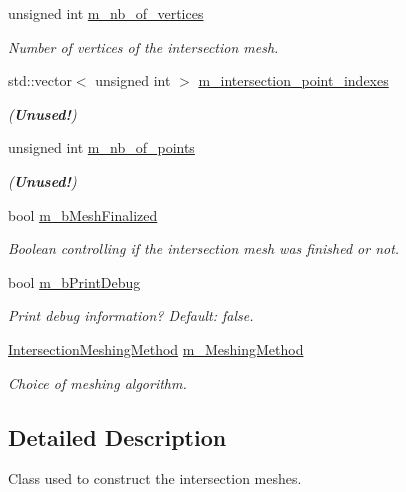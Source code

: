 \begin{DoxyCompactItemize}
unsigned int \hyperlink{classcarl_1_1_mesh___intersection_ac2765c9bdf5f15878a1cff52db5551aa}{m\+\_\+nb\+\_\+of\+\_\+vertices}
\begin{DoxyCompactList}\small\item\em Number of vertices of the intersection mesh. \end{DoxyCompactList}\item 
std\+::vector$<$ unsigned int $>$ \hyperlink{classcarl_1_1_mesh___intersection_aac5e4b495b7d8aa532ce28ca2d495c69}{m\+\_\+intersection\+\_\+point\+\_\+indexes}
\begin{DoxyCompactList}\small\item\em ({\bfseries Unused!}) \end{DoxyCompactList}\item 
unsigned int \hyperlink{classcarl_1_1_mesh___intersection_a64c49bef515c3b09edf6745d079056a2}{m\+\_\+nb\+\_\+of\+\_\+points}
\begin{DoxyCompactList}\small\item\em ({\bfseries Unused!}) \end{DoxyCompactList}\item 
bool \hyperlink{classcarl_1_1_mesh___intersection_ae858bc08b5286b0562eaf94372944bcd}{m\+\_\+b\+Mesh\+Finalized}
\begin{DoxyCompactList}\small\item\em Boolean controlling if the intersection mesh was finished or not. \end{DoxyCompactList}\item 
bool \hyperlink{classcarl_1_1_mesh___intersection_a086fd53554e5ecfad25b7b15012d71e4}{m\+\_\+b\+Print\+Debug}
\begin{DoxyCompactList}\small\item\em Print debug information? {\itshape Default\+:} false. \end{DoxyCompactList}\item 
\hyperlink{namespacecarl_a4f72fd25137b97ac1ca1276ec549e5cf}{Intersection\+Meshing\+Method} \hyperlink{classcarl_1_1_mesh___intersection_aa42a12f25859de7ce08655a1ada87e50}{m\+\_\+\+Meshing\+Method}
\begin{DoxyCompactList}\small\item\em Choice of meshing algorithm. \end{DoxyCompactList}\end{DoxyCompactItemize}


\subsection{Detailed Description}
Class used to construct the intersection meshes. 

